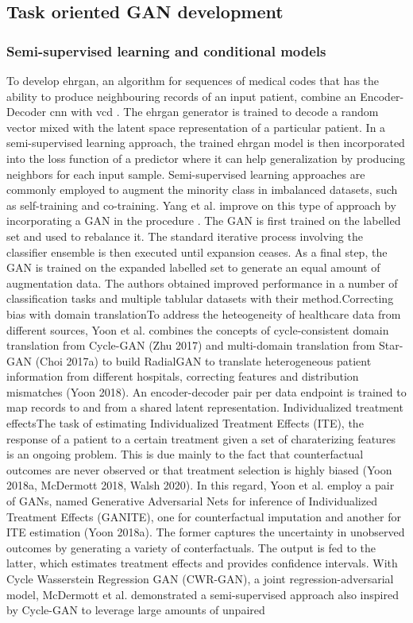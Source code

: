 \subsection{Task oriented GAN development}
\subsubsection{Semi-supervised learning and conditional models}

To develop \gls{ehrgan}, an algorithm for sequences of medical codes that has the ability to produce neighbouring records of an input patient, \citeauthor{Che_2017} combine an Encoder-Decoder \gls{cnn} \cite{ranzato2007unsupervised} with \gls{vcd} \cite{Che_2017}. The \gls{ehrgan} generator is trained to decode a random vector mixed with the latent space representation of a particular patient. In a semi-supervised learning approach, the trained \gls{ehrgan} model is then incorporated into the loss function of a predictor where it can help generalization by producing neighbors for each input sample. Semi-supervised learning approaches are commonly employed to augment the minority class in imbalanced datasets, such as \gls{self-training} and \gls{co-training}.  Yang et al. improve on this type of approach by incorporating a GAN in the procedure \cite{yang}. The GAN is first trained on the labelled set and used to rebalance it. The standard iterative process involving the classifier ensemble is then executed until expansion ceases. As a final step, the GAN is trained on the expanded labelled set to generate an equal amount of augmentation data. The authors obtained improved performance in a number of classification tasks and multiple tablular datasets with their method.Correcting bias with domain translationTo address the heteogeneity of healthcare data from different sources, Yoon et al. combines the concepts of cycle-consistent domain translation from Cycle-GAN (Zhu 2017) and multi-domain translation from Star-GAN (Choi 2017a) to build RadialGAN to translate heterogeneous patient information from different hospitals, correcting features and distribution mismatches (Yoon 2018). An encoder-decoder pair per data endpoint is trained to map records to and from a shared latent representation. Individualized treatment effectsThe task of estimating Individualized Treatment Effects (ITE), the response of a patient to a certain treatment given a set of charaterizing features is an ongoing problem. This is due mainly to the fact that counterfactual outcomes are never observed or that treatment selection is highly biased (Yoon 2018a, McDermott 2018, Walsh 2020). In this regard, Yoon et al. employ a pair of GANs, named Generative Adversarial Nets for inference of Individualized Treatment Effects (GANITE), one for counterfactual imputation and another for ITE estimation (Yoon 2018a). The former captures the uncertainty in unobserved outcomes by generating a variety of conterfactuals. The output is fed to the latter, which estimates treatment effects and provides confidence intervals. With Cycle Wasserstein Regression GAN (CWR-GAN), a joint regression-adversarial model, McDermott et al. demonstrated a semi-supervised approach also inspired by Cycle-GAN to leverage large amounts of unpaired 